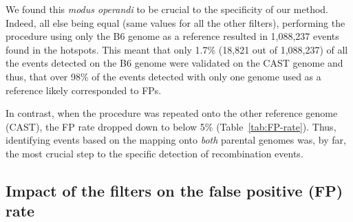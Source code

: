 We found this \textit{modus operandi} to be crucial to the specificity of our method.
Indeed, all else being equal (same values for all the other filters), performing the procedure using only the B6 genome as a reference resulted in 1,088,237 events found in the hotspots.
This meant that only 1.7\% (18,821 out of 1,088,237) of all the events detected on the B6 genome were validated on the CAST genome and thus, that over 98\% of the events detected with only one genome used as a reference likely corresponded to FPs.

In contrast, when the procedure was repeated onto the other reference genome (CAST), the FP rate dropped down to below 5\% (Table~\ref{tab:FP-rate}).
Thus, identifying events based on the mapping onto \textit{both} parental genomes was, by far, the most crucial step to the specific detection of recombination events.



\subsection{Impact of the filters on the false positive (FP) rate} 

